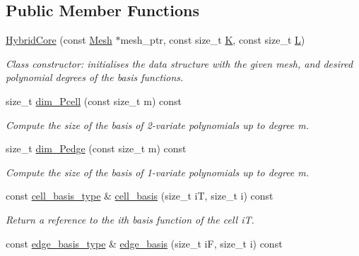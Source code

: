 \subsection*{Public Member Functions}
\begin{DoxyCompactItemize}
\item 
\hyperlink{classHArDCore2D_1_1HybridCore_ae189b44b4574688e4ae5c59d853317ab}{Hybrid\+Core} (const \hyperlink{classHArDCore2D_1_1Mesh}{Mesh} $\ast$mesh\+\_\+ptr, const size\+\_\+t \hyperlink{classHArDCore2D_1_1HybridCore_a74242d0a8b68fe5d9a35c6eb0effe3b2}{K}, const size\+\_\+t \hyperlink{classHArDCore2D_1_1HybridCore_af5aea2e23e91c582d8c8189a5bc7ae96}{L})
\begin{DoxyCompactList}\small\item\em Class constructor\+: initialises the data structure with the given mesh, and desired polynomial degrees of the basis functions. \end{DoxyCompactList}\item 
size\+\_\+t \hyperlink{classHArDCore2D_1_1HybridCore_aa2bdc59d150566e1b992058031509d2f}{dim\+\_\+\+Pcell} (const size\+\_\+t m) const
\begin{DoxyCompactList}\small\item\em Compute the size of the basis of 2-\/variate polynomials up to degree m. \end{DoxyCompactList}\item 
size\+\_\+t \hyperlink{classHArDCore2D_1_1HybridCore_ab0fb57313f27fb8b4a6e9747de1d5cfe}{dim\+\_\+\+Pedge} (const size\+\_\+t m) const
\begin{DoxyCompactList}\small\item\em Compute the size of the basis of 1-\/variate polynomials up to degree m. \end{DoxyCompactList}\item 
const \hyperlink{classHArDCore2D_1_1HybridCore_a4b9c53f6ec13dc9e73f5cdc5c8ae782b}{cell\+\_\+basis\+\_\+type} \& \hyperlink{classHArDCore2D_1_1HybridCore_a34242db07cc2b3c3b867d9e4580b634d}{cell\+\_\+basis} (size\+\_\+t iT, size\+\_\+t i) const
\begin{DoxyCompactList}\small\item\em Return a reference to the i\textquotesingle{}th basis function of the cell iT. \end{DoxyCompactList}\item 
const \hyperlink{classHArDCore2D_1_1HybridCore_a1f2030ea16722179fd3523e6e6675948}{edge\+\_\+basis\+\_\+type} \& \hyperlink{classHArDCore2D_1_1HybridCore_a6b4feaeef7739a2e30fcf6c601fcf721}{edge\+\_\+basis} (size\+\_\+t iF, size\+\_\+t i) const

\end{DoxyCompactItemize}
